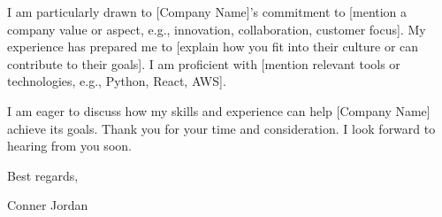 \documentclass[letterpaper,11pt]{article}
\begin{document}
\vspace{16pt}

I am particularly drawn to [Company Name]'s commitment to [mention a company value or aspect, e.g., innovation, collaboration, customer focus]. My experience has prepared me to [explain how you fit into their culture or can contribute to their goals]. I am proficient with [mention relevant tools or technologies, e.g., Python, React, AWS].

\vspace{16pt}

I am eager to discuss how my skills and experience can help [Company Name] achieve its goals. Thank you for your time and consideration. I look forward to hearing from you soon.
\vspace{16pt}

Best regards,\\
\vspace{16pt}

Conner Jordan
\end{document}
